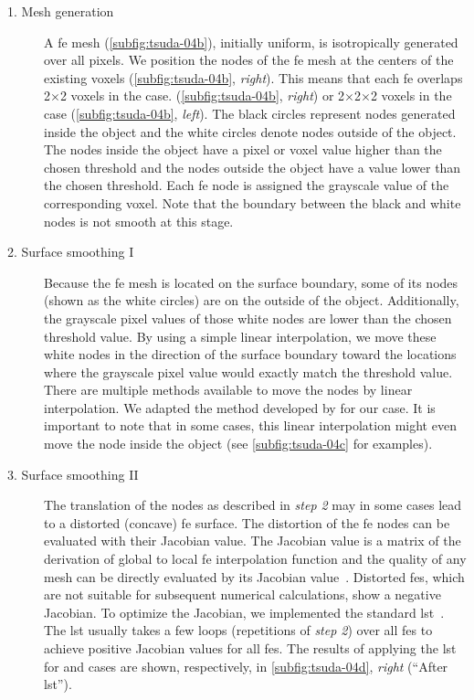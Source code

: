 \begin{description}
	\item[1. Mesh generation] A \ac{fe} mesh (\autoref{subfig:tsuda-04b}), initially uniform, is isotropically generated over all pixels. We position the nodes of the \ac{fe} mesh at the centers of the existing voxels (\autoref{subfig:tsuda-04b}, \emph{right}). This means that each \ac{fe} overlaps 2$\times$2 voxels in the \twod case. (\autoref{subfig:tsuda-04b}, \emph{right}) or 2$\times$2$\times$2 voxels in the \threed case (\autoref{subfig:tsuda-04b}, \emph{left}). The black circles represent nodes generated inside the object and the white circles denote nodes outside of the object. The nodes inside the object have a pixel or voxel value higher than the chosen threshold and the nodes outside the object have a value lower than the chosen threshold. Each \ac{fe} node is assigned the grayscale value of the corresponding voxel. Note that the boundary between the black and white nodes is not smooth at this stage.
	\item[2. Surface smoothing I] Because the \ac{fe} mesh is located on the surface boundary, some of its nodes (shown as the white circles) are on the outside of the object. Additionally, the grayscale pixel values of those white nodes are lower than the chosen threshold value. By using a simple linear interpolation, we move these white nodes in the direction of the surface boundary toward the locations where the grayscale pixel value would exactly match the threshold value. There are multiple methods available to move the nodes by linear interpolation. We adapted the method developed by \citet{Schneiders1996} for our \threed case. It is important to note that in some cases, this linear interpolation might even move the node inside the object (see \autoref{subfig:tsuda-04c} for examples).
	\item[3. Surface smoothing II] The translation of the nodes as described in \emph{step 2} may in some cases lead to a distorted (concave) \ac{fe} surface. The distortion of the \ac{fe} nodes can be evaluated with their Jacobian value. The Jacobian value is a matrix of the derivation of global to local \ac{fe} interpolation function and the quality of any mesh can be directly evaluated by its Jacobian value~\cite{Bathe1995}. Distorted \acp{fe}, which are not suitable for subsequent numerical calculations, show a negative Jacobian. To optimize the Jacobian, we implemented the standard \ac{lst}~\cite{Freitag2000}. The \ac{lst} usually takes a few loops (repetitions of \emph{step 2}) over all \acp{fe} to achieve positive Jacobian values for all \acp{fe}. The results of applying the \ac{lst} for \threed and \twod cases are shown, respectively, in \autoref{subfig:tsuda-04d}, \emph{right} (``After \ac{lst}'').
\end{description}

